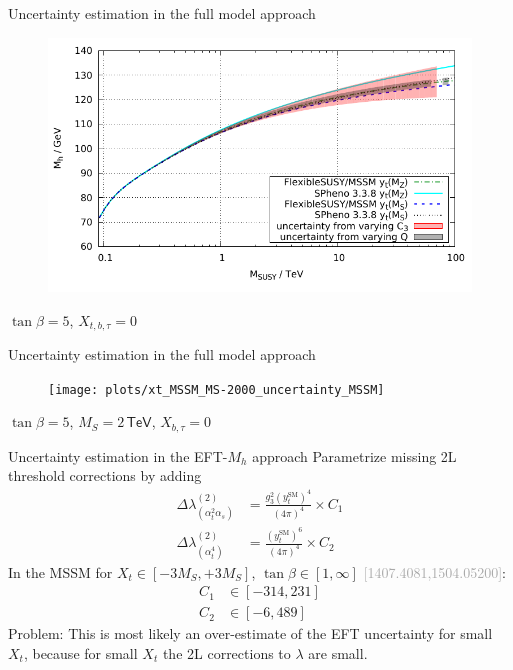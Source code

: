 \documentclass[hyperref={pdfpagelabels=false},ngerman]{beamer}
\newcommand{\eh}[1]{\,\mathsf{#1}}
\newcommand{\bigcite}[1]{\textcolor{darkgray}{[#1]}}
\newcommand{\SM}{\ensuremath{\text{SM}}}
\begin{document}
\begin{frame}{Uncertainty estimation in the full model approach}
  \begin{figure}
    \centering
    \includegraphics[width=\textwidth]{plots/scale_MSSM_yt_variants}
  \end{figure}
  $\tan\beta = 5$, $X_{t,b,\tau} = 0$
\end{frame}

\begin{frame}{Uncertainty estimation in the full model approach}
  \begin{figure}
    \centering
    \texttt{[image: plots/xt\_MSSM\_MS-2000\_uncertainty\_MSSM]}
  \end{figure}
  $\tan\beta = 5$, $M_S = 2\eh{TeV}$, $X_{b,\tau} = 0$
\end{frame}

\begin{frame}{Uncertainty estimation in the EFT-$M_h$ approach}
  Parametrize missing 2L threshold corrections by adding
  \begin{align*}
    \Delta\lambda^{(2)}_{(\alpha_t^2 \alpha_s)}
    &= \frac{g_3^2 (y_t^\SM)^4}{(4\pi)^4} \times C_1 \\
    \Delta\lambda^{(2)}_{(\alpha_t^4)}
    &= \frac{(y_t^\SM)^6}{(4\pi)^4} \times C_2
  \end{align*}
  In the MSSM for $X_t\in [-3M_S,+3M_S]$, $\tan\beta \in [1,\infty]$
  \bigcite{1407.4081,1504.05200}:
  \begin{align*}
    C_1&\in[-314, 231] \\ C_2&\in[-6, 489]
  \end{align*}
  Problem: This is most likely an over-estimate of the EFT uncertainty
  for small $X_t$, because for small $X_t$ the 2L corrections to
  $\lambda$ are small.
\end{frame}
\end{document}
